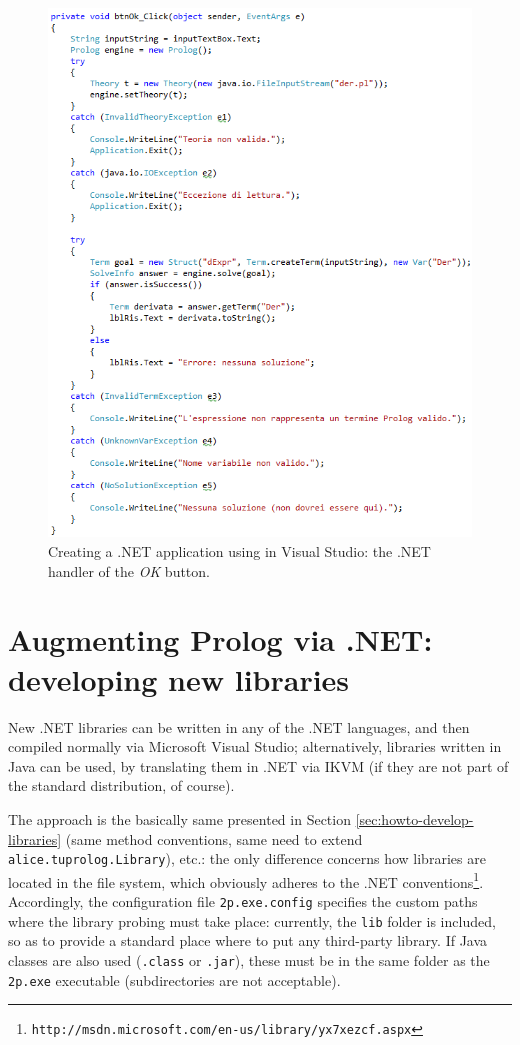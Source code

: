 \begin{figure}
  \includegraphics[width=12cm]{images/dotnet-visualstudio4}
  \caption{Creating a .NET application using \tuprolog{} in Visual Studio: the .NET handler of the \textit{OK} button.}\label{fig:dotnet-visualstudio4}
\end{figure}


\section{Augmenting Prolog via .NET:\\developing new libraries}
\label{sec:dotnet-developing new libraries}

New \tuprolog{}.NET libraries can be written in any of the .NET languages, and then compiled normally via Microsoft Visual Studio; alternatively, libraries written in Java can be used, by translating them in .NET via IKVM (if they are not part of the standard \tuprolog{} distribution, of course).

The approach is the basically same presented in Section \ref{sec:howto-develop-libraries} (same method conventions, same need to extend \texttt{alice.tuprolog.Library}), etc.: the only difference concerns how libraries are located in the file system, which obviously adheres to the .NET conventions\footnote{
\texttt{http://msdn.microsoft.com/en-us/library/yx7xezcf.aspx}}.
Accordingly, the configuration file \texttt{2p.exe.config} specifies the custom paths where the library probing must take place: currently, the \texttt{lib} folder is included, so as to provide a standard place where to put any third-party library.
%
If Java classes are also used (\texttt{.class} or \texttt{.jar}), these must be in the same folder as the \texttt{2p.exe} executable (subdirectories are not acceptable).

